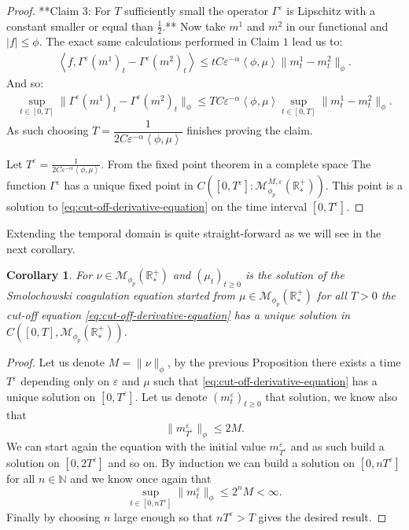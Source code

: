 \documentclass[11pt,a4paper]{article}
\newcommand{\NN}{\mathbb{N}}
\newcommand{\RRP}{\mathbb{R}^+_*}
\newcommand{\MC}{\mathcal{M}}
\newcommand{\Proc}[1]{\left(#1\right)_{t\geq 0}}
\newcommand{\brac}[1]{\left\langle#1\right\rangle}
\newtheorem{corollary}[theorem]{Corollary}
\begin{document}
\begin{proof}
    **Claim 3: For $T$ sufficiently small the operator $\Gamma^\varepsilon$ is Lipschitz with a constant smaller or equal than $\frac12$.** Now take $m^1$ and $m^2$ in our functional and $|f| \leq \phi$. The exact same calculations performed in Claim $1$ lead us to:
    \begin{align*}
        \brac{f, \Gamma^\varepsilon(m^1)_t - \Gamma^\varepsilon(m^2)_t}  \leq tC\varepsilon^{-\alpha}\brac{\phi,\mu} \| m^1_t - m^2_t\|_{\phi}.
    \end{align*}
    And so:
    \begin{align*}
        \sup\limits_{t \in [0,T]} \| \Gamma^\varepsilon(m^1)_t - \Gamma^\varepsilon(m^2)_t\|_{\phi}
        \leq TC\varepsilon^{-\alpha}\brac{\phi,\mu}\sup\limits_{t \in [0,T]} \| m^1_t - m^2_t\|_{\phi}.
    \end{align*}
    As such choosing $T = \dfrac{1}{2C\varepsilon^{-\alpha}\brac{\phi,\mu}}$ finishes proving the claim.

    Let $T^\varepsilon = \frac{1}{2C\varepsilon^{-\alpha}\brac{\phi,\mu}}$. From the fixed point theorem in a complete space The function $\Gamma^\varepsilon$ has a unique fixed point in \(C\left([0,T^\varepsilon]:\MC^{M,\varepsilon}_{\phi_p}\left(\RRP\right) \right) \). This point is a solution to \eqref{eq:cut-off-derivative-equation} on the time interval $[0,T^\varepsilon]$.
\end{proof}
Extending the temporal domain is quite straight-forward as we will see in the next corollary.
\begin{corollary}\label{cor:well-posedness-derivative-unbounded-space}
    For $\nu \in \MC_{\phi_p}(\RRP)$ and $\Proc{\mu_t}$ is the solution of the Smolochowski coagulation equation started from $\mu \in \MC_{\phi_p}(\RRP)$ for all $T > 0$ the cut-off equation \eqref{eq:cut-off-derivative-equation} has a unique solution in $C\left([0,T],\MC_{\phi_p}(\RRP)\right)$. 
\end{corollary}
\begin{proof}
    Let us denote \(M = \|\nu \|_{\phi}\), by the previous Proposition there exists a time $T^\varepsilon$ depending only on $\varepsilon$ and $\mu$ such that \eqref{eq:cut-off-derivative-equation} has a unique solution on \( [0,T^\varepsilon]\). Let us denote $\Proc{m^\varepsilon_t}$ that solution, we know also that 
    \[\|m^\varepsilon_{T^\varepsilon} \|_{\phi} \leq 2M.\]
    We can start again the equation with the initial value \(m^\varepsilon_{T^\varepsilon}\) and as such build a solution on \( [0,2T^\varepsilon]\) and so on. By induction we can build a solution on \( [0,nT^\varepsilon]\) for all $n \in \NN$ and we know once again that
    \[ \sup\limits_{t \in [0,n T^\varepsilon]}\|m^\varepsilon_{t} \|_{\phi} \leq 2^n M < \infty .\]
    Finally by choosing $n$ large enough so that \( n T^\varepsilon > T\) gives the desired result.
\end{proof}
\end{document}
